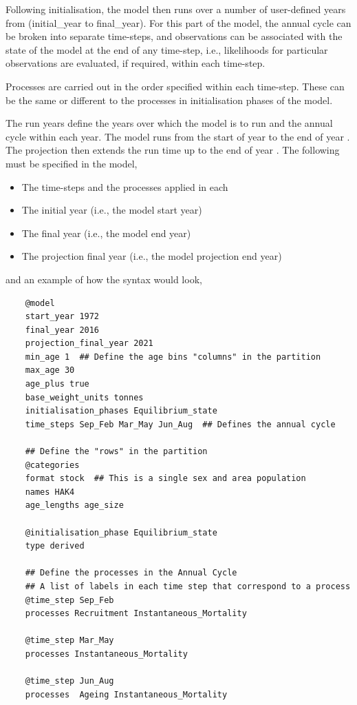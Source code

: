 Following initialisation, the model then runs over a number of user-defined years from (initial\_year to final\_year). For this part of the model, the annual cycle can be broken into separate time-steps, and observations can be associated with the state of the model at the end of any time-step, i.e., likelihoods for particular observations are evaluated, if required, within each time-step. 

Processes are carried out in the order specified within each time-step. These can be the same or different to the processes in initialisation phases of the model. 

The run years define the years over which the model is to run and the annual cycle within each year. The model runs from the start of year  to the end of year . The projection then extends the run time up to the end of year . The following must be specified in the model,
\begin{itemize}
  \item The time-steps and the processes applied in each
  \item The initial year (i.e., the model start year)
  \item The final year (i.e., the model end year)
  \item The projection final year (i.e., the model projection end year)
\end{itemize}

and an example of how the syntax would look,

{\small{\begin{verbatim}	
	@model
	start_year 1972
	final_year 2016
	projection_final_year 2021
	min_age 1  ## Define the age bins "columns" in the partition
	max_age 30
	age_plus true
	base_weight_units tonnes
	initialisation_phases Equilibrium_state
	time_steps Sep_Feb Mar_May Jun_Aug  ## Defines the annual cycle

	## Define the "rows" in the partition
	@categories 
	format stock  ## This is a single sex and area population
	names HAK4 
	age_lengths age_size 
	
	@initialisation_phase Equilibrium_state
	type derived
	
	## Define the processes in the Annual Cycle
	## A list of labels in each time step that correspond to a process
	@time_step Sep_Feb 
	processes Recruitment Instantaneous_Mortality
	
	@time_step Mar_May 
	processes Instantaneous_Mortality 
	
	@time_step Jun_Aug 
	processes  Ageing Instantaneous_Mortality
\end{verbatim}}}
	

